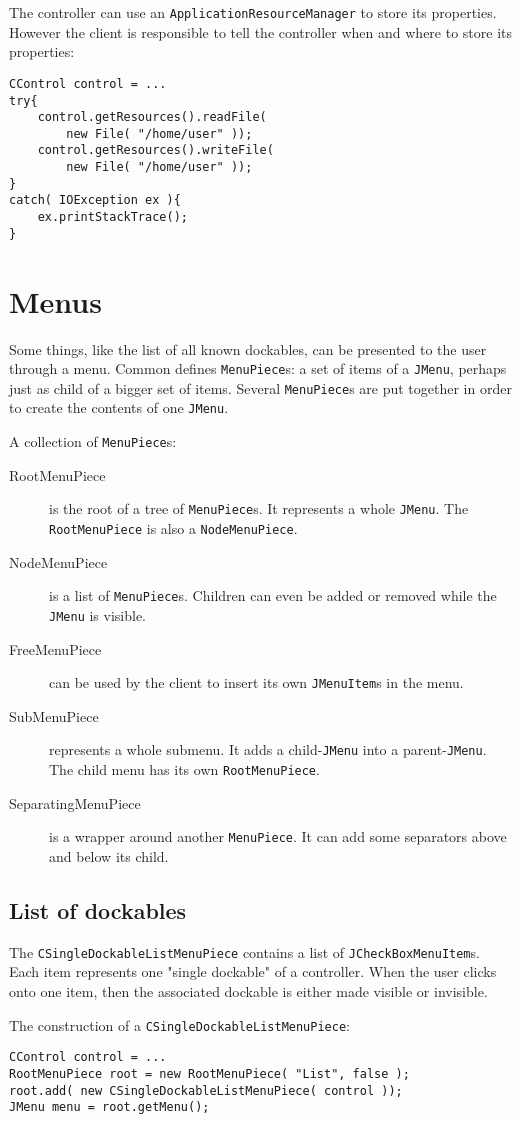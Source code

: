 \documentclass[a4paper,10pt]{article}
\newcommand{\src}[1]{\lstinline[basicstyle=\ttfamily]|#1|}
\begin{document}
The controller can use an \src{ApplicationResourceManager} to store its properties. However the client is responsible to tell the controller when and where to store its properties:
\begin{lstlisting}
CControl control = ...
try{
	control.getResources().readFile(
		new File( "/home/user" ));
	control.getResources().writeFile(
		new File( "/home/user" ));
}
catch( IOException ex ){
	ex.printStackTrace();
}
\end{lstlisting}

\section{Menus}
Some things, like the list of all known dockables, can be presented to the user through a menu. Common defines \src{MenuPiece}s: a set of items of a \src{JMenu}, perhaps just as child of a bigger set of items. Several \src{MenuPiece}s are put together in order to create the contents of one \src{JMenu}.

A collection of \src{MenuPiece}s:
\begin{description}
 \item[RootMenuPiece] is the root of a tree of \src{MenuPiece}s. It represents a whole \src{JMenu}. The \src{RootMenuPiece} is also a \src{NodeMenuPiece}.
 \item[NodeMenuPiece] is a list of \src{MenuPiece}s. Children can even be added or removed while the \src{JMenu} is visible.
 \item[FreeMenuPiece] can be used by the client to insert its own \src{JMenuItem}s in the menu.
 \item[SubMenuPiece] represents a whole submenu. It adds a child-\src{JMenu} into a parent-\src{JMenu}. The child menu has its own \src{RootMenuPiece}.
 \item[SeparatingMenuPiece] is a wrapper around another \src{MenuPiece}. It can add some separators above and below its child.
\end{description}

\subsection{List of dockables}
The \src{CSingleDockableListMenuPiece} contains a list of \src{JCheckBoxMenuItem}s. Each item represents one "single dockable" of a controller. When the user clicks onto one item, then the associated dockable is either made visible or invisible.

The construction of a \src{CSingleDockableListMenuPiece}:
\begin{lstlisting}
CControl control = ...
RootMenuPiece root = new RootMenuPiece( "List", false );
root.add( new CSingleDockableListMenuPiece( control ));
JMenu menu = root.getMenu();
\end{lstlisting}
\end{document}

